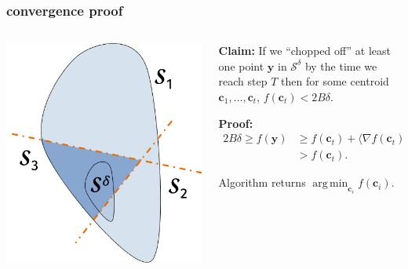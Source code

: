 \documentclass[compress]{beamer}
\newcommand{\bv}[1]{\mathbf{#1}}
\DeclareMathOperator*{\argmin}{arg\,min}
\begin{document}
\begin{frame}
	\frametitle{convergence proof}
	\begin{columns}
		\begin{column}{.4\textwidth}
			\includegraphics[width=\textwidth]{cut_off.png}
		\end{column}
		\begin{column}{.6\textwidth}
			\vspace{.5em}
			\textbf{Claim:} If we ``chopped off'' at least one point $\bv{y}$ in $\mathcal{S}^\delta$ by the time we reach step $T$ then for some centroid $\bv{c}_1, \ldots, \bv{c}_t$, $f(\bv{c}_t) < 2B\delta$. 
			\vspace{1em}
			
			\textbf{Proof:} 
			\begin{align*}
							2B\delta \geq f(\bv{y}) &\geq f(\bv{c}_t) +  \langle\nabla f(\bv{c}_t), \bv{y}-\bv{c}_t\rangle\\ &> f(\bv{c}_t).
			\end{align*}
		
			Algorithm returns $\argmin_{\bv{c}_i} f(\bv{c}_i)$.

		\end{column}
	\end{columns}
\end{frame}
\end{document}
